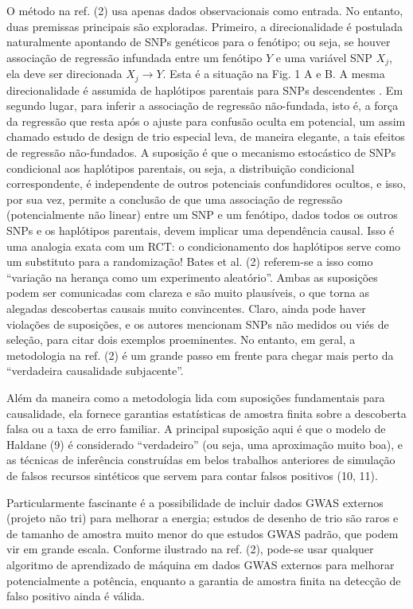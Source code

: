     O método na ref. (2) usa apenas dados observacionais como entrada. No entanto, duas premissas principais são exploradas. Primeiro, a direcionalidade é postulada naturalmente apontando de SNPs genéticos para o fenótipo; ou seja, se houver associação de regressão infundada entre um fenótipo \(Y\) e uma variável SNP \(X_j\), ela deve ser direcionada \(X_j \to Y\). Esta é a situação na Fig. 1 A e B. A mesma direcionalidade é assumida de haplótipos parentais para SNPs descendentes . Em segundo lugar, para inferir a associação de regressão não-fundada, isto é, a força da regressão que resta após o ajuste para confusão oculta em potencial, um assim chamado estudo de design de trio especial leva, de maneira elegante, a tais efeitos de regressão não-fundados. A suposição é que o mecanismo estocástico de SNPs condicional aos haplótipos parentais, ou seja, a distribuição condicional correspondente, é independente de outros potenciais confundidores ocultos, e isso, por sua vez, permite a conclusão de que uma associação de regressão (potencialmente não linear) entre um SNP e um fenótipo, dados todos os outros SNPs e os haplótipos parentais, devem implicar uma dependência causal. Isso é uma analogia exata com um RCT: o condicionamento dos haplótipos serve como um substituto para a randomização! Bates et al. (2) referem-se a isso como ``variação na herança como um experimento aleatório''. Ambas as suposições podem ser comunicadas com clareza e são muito plausíveis, o que torna as alegadas descobertas causais muito convincentes. Claro, ainda pode haver violações de suposições, e os autores mencionam SNPs não medidos ou viés de seleção, para citar dois exemplos proeminentes. No entanto, em geral, a metodologia na ref. (2) é um grande passo em frente para chegar mais perto da ``verdadeira causalidade subjacente''.

    Além da maneira como a metodologia lida com suposições fundamentais para causalidade, ela fornece garantias estatísticas de amostra finita sobre a descoberta falsa ou a taxa de erro familiar. A principal suposição aqui é que o modelo de Haldane (9) é considerado ``verdadeiro'' (ou seja, uma aproximação muito boa), e as técnicas de inferência construídas em belos trabalhos anteriores de simulação de falsos recursos sintéticos que servem para contar falsos positivos (10, 11).

    Particularmente fascinante é a possibilidade de incluir dados GWAS externos (projeto não tri) para melhorar a energia; estudos de desenho de trio são raros e de tamanho de amostra muito menor do que estudos GWAS padrão, que podem vir em grande escala. Conforme ilustrado na ref. (2), pode-se usar qualquer algoritmo de aprendizado de máquina em dados GWAS externos para melhorar potencialmente a potência, enquanto a garantia de amostra finita na detecção de falso positivo ainda é válida.


